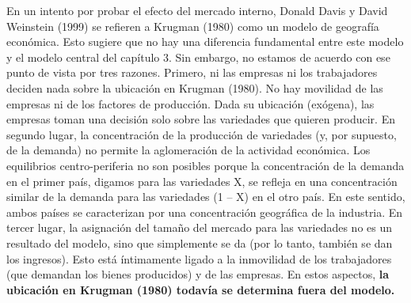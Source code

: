 En un intento por probar el efecto del mercado interno, Donald Davis y David Weinstein (1999) se refieren a Krugman (1980) como un modelo de geografía económica. Esto sugiere que no hay una diferencia fundamental entre este modelo y el modelo central del capítulo 3. Sin embargo, no estamos de acuerdo con ese punto de vista por tres razones. Primero, ni las empresas ni los trabajadores deciden nada sobre la ubicación en Krugman (1980). No hay movilidad de las empresas ni de los factores de producción. Dada su ubicación (exógena), las empresas toman una decisión solo sobre las variedades que quieren producir. En segundo lugar, la concentración de la producción de variedades (y, por supuesto, de la demanda) no permite la aglomeración de la actividad económica. Los equilibrios centro-periferia no son posibles porque la concentración de la demanda en el primer país, digamos para las variedades X, se refleja en una concentración similar de la demanda para las variedades (1 – X) en el otro país. En este sentido, ambos países se caracterizan por una concentración geográfica de la industria. En tercer lugar, la asignación del tamaño del mercado para las variedades no es un resultado del modelo, sino que simplemente se da (por lo tanto, también se dan los ingresos). Esto está íntimamente ligado a la inmovilidad de los trabajadores (que demandan los bienes producidos) y de las empresas. En estos aspectos, \textbf{la ubicación en Krugman (1980) todavía se determina fuera del modelo.}

